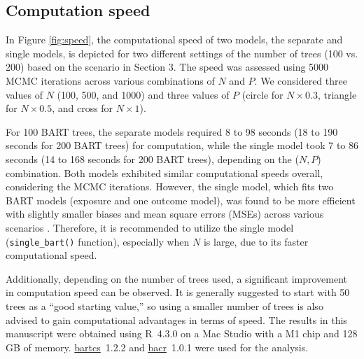\subsection{Computation speed}\label{sec:speed}
In Figure \ref{fig:speed}, the computational speed of two models, the separate and single models, is depicted for two different settings of the number of trees (100 vs. 200) based on the scenario in Section 3. The speed was assessed using 5000 MCMC iterations across various combinations of $N$ and $P$. We considered three values of $N$ (100, 500, and 1000) and three values of $P$ (circle for $N\times 0.3$, triangle for $N\times 0.5$, and cross for $N\times 1$).

For 100 BART trees, the separate models required 8 to 98 seconds (18 to 190 seconds for 200 BART trees) for computation, while the single model took 7 to 86 seconds (14 to 168 seconds for 200 BART trees), depending on the ($N, P$) combination. Both models exhibited similar computational speeds overall, considering the MCMC iterations. However, the single model, which fits two BART models (exposure and one outcome model), was found to be more efficient with slightly smaller biases and mean square errors (MSEs) across various scenarios \citep{kim2023bnp}. Therefore, it is recommended to utilize the single model (\verb|single_bart()| function), especially when $N$ is large, due to its faster computational speed.

Additionally, depending on the number of trees used, a significant improvement in computation speed can be observed. It is generally suggested to start with 50 trees as a ``good starting value,'' \citep{kapelner2013bartmachine} so using a smaller number of trees is also advised to gain computational advantages in terms of speed.
The results in this manuscript were obtained using R~4.3.0 on a Mac Studio with
a M1 chip and 128 GB of memory. \href{https://cran.r-project.org/package=bartcs}{bartcs}~1.2.2 and \href{https://cran.r-project.org/package=bacr}{bacr}~1.0.1 were used for the analysis.


